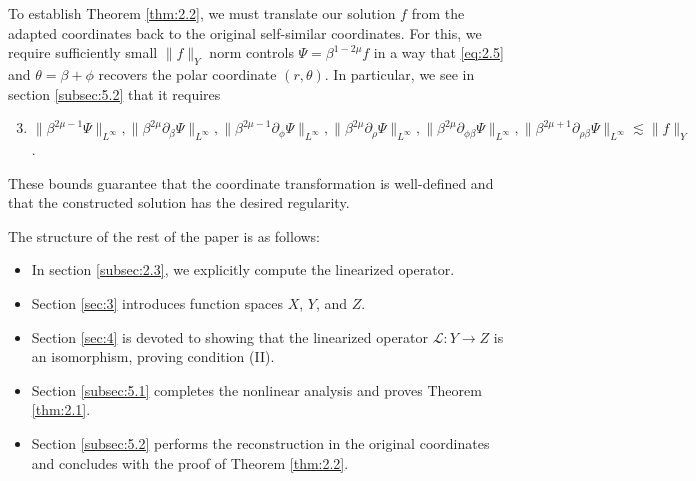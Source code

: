 \documentclass[11pt]{article}
\theoremstyle{definition}
\theoremstyle{remark}
\numberwithin{equation}{section}
\newcommand{\mcal}{\mathcal}
\newcommand{\del}{\partial}
\newcommand{\norm}[1]{\lVert #1 \rVert}
\begin{document}
To establish Theorem \ref{thm:2.2}, we must translate our solution $f$ from the adapted coordinates back to the original self-similar coordinates. For this, we require sufficiently small $\norm{f}_Y$ norm controls $\Psi = \beta^{1-2\mu} f$ in a way that \eqref{eq:2.5} and $\theta = \beta + \phi$ recovers the polar coordinate $(r,\theta)$. In particular, we see in section \ref{subsec:5.2} that it requires
\vspace{-.5em}\begin{enumerate}[label=(\Roman*)] \setcounter{enumi}{2}
  \item $\norm{\beta^{2\mu - 1}\Psi}_{L^\infty}, \norm{\beta^{2\mu} \del_\beta \Psi}_{L^\infty}, \norm{\beta^{2\mu - 1}\del_\phi \Psi}_{L^\infty}, \norm{\beta^{2\mu} \del_\rho \Psi}_{L^\infty}, \norm{\beta^{2\mu} \del_{\phi\beta}\Psi}_{L^\infty}, \norm{\beta^{2\mu + 1}\del_{\rho\beta} \Psi}_{L^\infty} \lesssim \norm{f}_Y$.
\end{enumerate}
\vspace{-.5em} These bounds guarantee that the coordinate transformation is well-defined and that the constructed solution has the desired regularity.

\noindent The structure of the rest of the paper is as follows:
\vspace{-.5em}\begin{itemize}
	\item In section \ref{subsec:2.3}, we explicitly compute the linearized operator.
	\item Section \ref{sec:3} introduces function spaces $X$, $Y$, and $Z$.
	\item Section \ref{sec:4} is devoted to showing that the linearized operator $\mcal{L} : Y \to Z$ is an isomorphism, proving condition (II).
	\item Section \ref{subsec:5.1} completes the nonlinear analysis and proves Theorem \ref{thm:2.1}.
	\item Section \ref{subsec:5.2} performs the reconstruction in the original coordinates and concludes with the proof of Theorem \ref{thm:2.2}.
\end{itemize}
\end{document}
